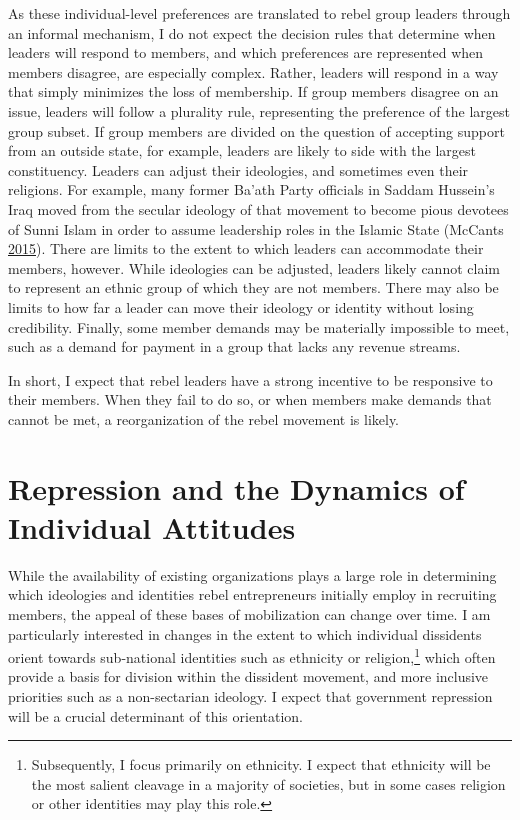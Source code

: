 \documentclass[12pt,]{book}
\let\rmarkdownfootnote\footnote%
\def\footnote{\protect\rmarkdownfootnote}
\theoremstyle{definition}
\theoremstyle{definition}
\theoremstyle{definition}
\theoremstyle{remark}
\begin{document}
As these individual-level preferences are translated to rebel group
leaders through an informal mechanism, I do not expect the decision
rules that determine when leaders will respond to members, and which
preferences are represented when members disagree, are especially
complex. Rather, leaders will respond in a way that simply minimizes the
loss of membership. If group members disagree on an issue, leaders will
follow a plurality rule, representing the preference of the largest
group subset. If group members are divided on the question of accepting
support from an outside state, for example, leaders are likely to side
with the largest constituency. Leaders can adjust their ideologies, and
sometimes even their religions. For example, many former Ba'ath Party
officials in Saddam Hussein's Iraq moved from the secular ideology of
that movement to become pious devotees of Sunni Islam in order to assume
leadership roles in the Islamic State (McCants
\protect\hyperlink{ref-McCants2015}{2015}). There are limits to the
extent to which leaders can accommodate their members, however. While
ideologies can be adjusted, leaders likely cannot claim to represent an
ethnic group of which they are not members. There may also be limits to
how far a leader can move their ideology or identity without losing
credibility. Finally, some member demands may be materially impossible
to meet, such as a demand for payment in a group that lacks any revenue
streams.

In short, I expect that rebel leaders have a strong incentive to be
responsive to their members. When they fail to do so, or when members
make demands that cannot be met, a reorganization of the rebel movement
is likely.

\hypertarget{repression-and-the-dynamics-of-individual-attitudes}{%
\section{Repression and the Dynamics of Individual
Attitudes}\label{repression-and-the-dynamics-of-individual-attitudes}}

While the availability of existing organizations plays a large role in
determining which ideologies and identities rebel entrepreneurs
initially employ in recruiting members, the appeal of these bases of
mobilization can change over time. I am particularly interested in
changes in the extent to which individual dissidents orient towards
sub-national identities such as ethnicity or religion,\footnote{Subsequently,
  I focus primarily on ethnicity. I expect that ethnicity will be the
  most salient cleavage in a majority of societies, but in some cases
  religion or other identities may play this role.} which often provide
a basis for division within the dissident movement, and more inclusive
priorities such as a non-sectarian ideology. I expect that government
repression will be a crucial determinant of this orientation.
\end{document}
